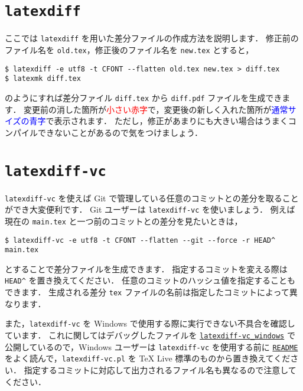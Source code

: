\section{\texttt{latexdiff}}
\label{sec:latexdiff}

ここでは \verb|latexdiff| を用いた差分ファイルの作成方法を説明します．
修正前のファイル名を \verb|old.tex|，修正後のファイル名を \verb|new.tex| とすると，
\begin{tcolorbox}[title={\texttt{latexdiff} を使用した差分ファイルの生成方法}]
\begin{verbatim}
$ latexdiff -e utf8 -t CFONT --flatten old.tex new.tex > diff.tex
$ latexmk diff.tex
\end{verbatim}
\end{tcolorbox}
\noindent
のようにすれば差分ファイル \verb|diff.tex| から \verb|diff.pdf| ファイルを生成できます．
変更前の消した箇所が\textcolor{red}{\scriptsize 小さい赤字}で，変更後の新しく入れた箇所が\textcolor{blue}{\sffamily 通常サイズの青字}で表示されます．
ただし，修正があまりにも大きい場合はうまくコンパイルできないことがあるので気をつけましょう．

\section{\texttt{latexdiff-vc}}
\label{sec:latexdiff-vc}

\verb|latexdiff-vc| を使えば Git で管理している任意のコミットとの差分を取ることができ大変便利です．
Git ユーザーは \verb|latexdiff-vc| を使いましょう．
例えば現在の \verb|main.tex| と一つ前のコミットとの差分を見たいときは，
\begin{tcolorbox}[title={\texttt{latexdiff-vc} を使用した差分ファイルの生成方法}]
\begin{verbatim}
$ latexdiff-vc -e utf8 -t CFONT --flatten --git --force -r HEAD^ main.tex
\end{verbatim}
\end{tcolorbox}
\noindent
とすることで差分ファイルを生成できます．
指定するコミットを変える際は \verb|HEAD^| を置き換えてください．
任意のコミットのハッシュ値を指定することもできます．
生成される差分 \verb|tex| ファイルの名前は指定したコミットによって異なります．

また，\verb|latexdiff-vc| を Windows で使用する際に実行できない不具合を確認しています．
これに関してはデバッグしたファイルを \href{https://github.com/Yuki-MATSUKAWA/latexdiff-vc_windows}{\texttt{latexdiff-vc\_windows}} で公開しているので，Windows ユーザーは \verb|latexdiff-vc| を使用する前に \href{https://github.com/Yuki-MATSUKAWA/latexdiff-vc_windows?tab=readme-ov-file#readme}{\texttt{README}} をよく読んで，\verb|latexdiff-vc.pl| を TeX Live 標準のものから置き換えてください．
指定するコミットに対応して出力されるファイル名も異なるので注意してください．

